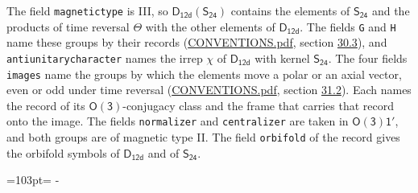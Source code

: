 \documentclass[10pt,a4paper]{article}
\newcommand{\needspace}[1]{\par\penalty-100\begingroup\dimen0=#1\relax\dimen2=\pagegoal
  \advance\dimen2-\pagetotal\ifdim\dimen0>\dimen2\relax\ifdim\dimen2>0pt\vfil\break\fi\fi
  \endgroup}
\numberwithin{equation}{section}
\newcommand{\grp}[1]{\mathsf{#1}}
\begin{document}
The field \texttt{magnetictype} is III, so $\grp{D_{12d}}(\grp{S_{24}})$ contains the elements of $\grp{S_{24}}$ and the products of time reversal $\varTheta$ with the other elements of $\grp{D_{12d}}$. The fields \texttt{G} and \texttt{H} name these groups by their records (\href{../../CONVENTIONS.pdf}{CONVENTIONS.pdf}, section \href{../../CONVENTIONS.pdf\#conv.30.3}{30.3}), and \texttt{antiunitarycharacter} names the irrep $\chi$ of $\grp{D_{12d}}$ with kernel $\grp{S_{24}}$. The four fields \texttt{images} name the groups by which the elements move a polar or an axial vector, even or odd under time reversal (\href{../../CONVENTIONS.pdf}{CONVENTIONS.pdf}, section \href{../../CONVENTIONS.pdf\#conv.31.2}{31.2}). Each names the record of its $\grp{O(3)}$-conjugacy class and the frame that carries that record onto the image. The fields \texttt{normalizer} and \texttt{centralizer} are taken in $\grp{O(3)1'}$, and both groups are of magnetic type II. The field \texttt{orbifold} of the record gives the orbifold symbols of $\grp{D_{12d}}$ and of $\grp{S_{24}}$.
\needspace{103pt}
\end{document}
